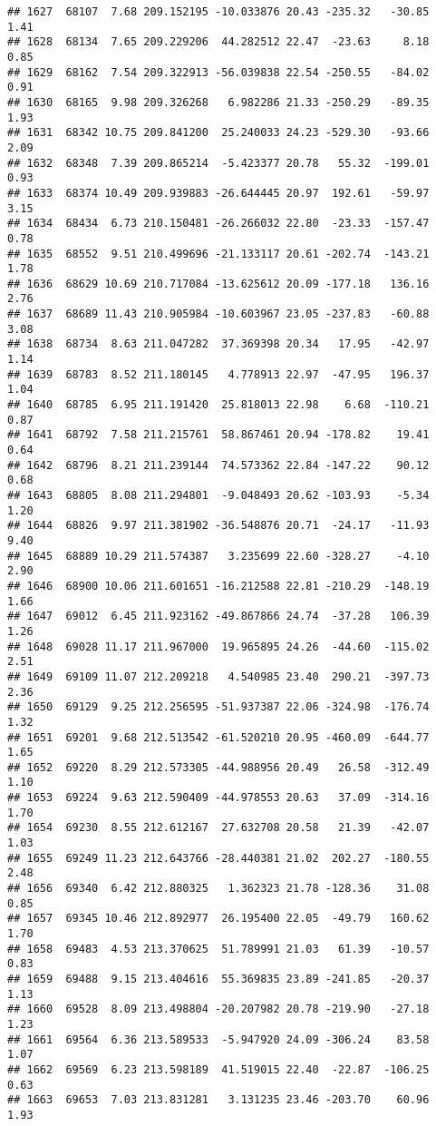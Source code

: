 \documentclass[]{article}
\begin{document}
\begin{verbatim}
## 1627  68107  7.68 209.152195 -10.033876 20.43 -235.32   -30.85  1.41
## 1628  68134  7.65 209.229206  44.282512 22.47  -23.63     8.18  0.85
## 1629  68162  7.54 209.322913 -56.039838 22.54 -250.55   -84.02  0.91
## 1630  68165  9.98 209.326268   6.982286 21.33 -250.29   -89.35  1.93
## 1631  68342 10.75 209.841200  25.240033 24.23 -529.30   -93.66  2.09
## 1632  68348  7.39 209.865214  -5.423377 20.78   55.32  -199.01  0.93
## 1633  68374 10.49 209.939883 -26.644445 20.97  192.61   -59.97  3.15
## 1634  68434  6.73 210.150481 -26.266032 22.80  -23.33  -157.47  0.78
## 1635  68552  9.51 210.499696 -21.133117 20.61 -202.74  -143.21  1.78
## 1636  68629 10.69 210.717084 -13.625612 20.09 -177.18   136.16  2.76
## 1637  68689 11.43 210.905984 -10.603967 23.05 -237.83   -60.88  3.08
## 1638  68734  8.63 211.047282  37.369398 20.34   17.95   -42.97  1.14
## 1639  68783  8.52 211.180145   4.778913 22.97  -47.95   196.37  1.04
## 1640  68785  6.95 211.191420  25.818013 22.98    6.68  -110.21  0.87
## 1641  68792  7.58 211.215761  58.867461 20.94 -178.82    19.41  0.64
## 1642  68796  8.21 211.239144  74.573362 22.84 -147.22    90.12  0.68
## 1643  68805  8.08 211.294801  -9.048493 20.62 -103.93    -5.34  1.20
## 1644  68826  9.97 211.381902 -36.548876 20.71  -24.17   -11.93  9.40
## 1645  68889 10.29 211.574387   3.235699 22.60 -328.27    -4.10  2.90
## 1646  68900 10.06 211.601651 -16.212588 22.81 -210.29  -148.19  1.66
## 1647  69012  6.45 211.923162 -49.867866 24.74  -37.28   106.39  1.26
## 1648  69028 11.17 211.967000  19.965895 24.26  -44.60  -115.02  2.51
## 1649  69109 11.07 212.209218   4.540985 23.40  290.21  -397.73  2.36
## 1650  69129  9.25 212.256595 -51.937387 22.06 -324.98  -176.74  1.32
## 1651  69201  9.68 212.513542 -61.520210 20.95 -460.09  -644.77  1.65
## 1652  69220  8.29 212.573305 -44.988956 20.49   26.58  -312.49  1.10
## 1653  69224  9.63 212.590409 -44.978553 20.63   37.09  -314.16  1.70
## 1654  69230  8.55 212.612167  27.632708 20.58   21.39   -42.07  1.03
## 1655  69249 11.23 212.643766 -28.440381 21.02  202.27  -180.55  2.48
## 1656  69340  6.42 212.880325   1.362323 21.78 -128.36    31.08  0.85
## 1657  69345 10.46 212.892977  26.195400 22.05  -49.79   160.62  1.70
## 1658  69483  4.53 213.370625  51.789991 21.03   61.39   -10.57  0.83
## 1659  69488  9.15 213.404616  55.369835 23.89 -241.85   -20.37  1.13
## 1660  69528  8.09 213.498804 -20.207982 20.78 -219.90   -27.18  1.23
## 1661  69564  6.36 213.589533  -5.947920 24.09 -306.24    83.58  1.07
## 1662  69569  6.23 213.598189  41.519015 22.40  -22.87  -106.25  0.63
## 1663  69653  7.03 213.831281   3.131235 23.46 -203.70    60.96  1.93

\end{verbatim}
\end{document}
